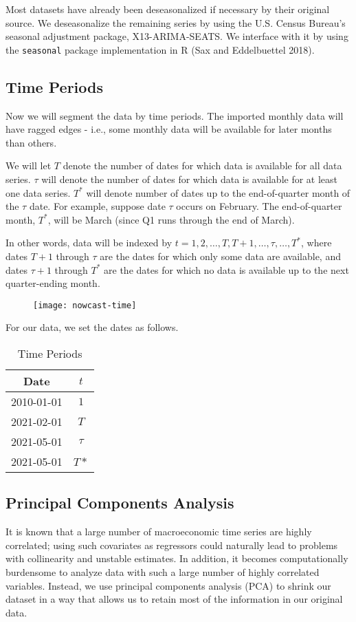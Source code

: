 \documentclass[11pt, letterpaper]{article}\usepackage[]{graphicx}\usepackage[]{color}
\begin{document}
Most datasets have already been deseasonalized if necessary by their original source. We deseasonalize the remaining series by using the U.S. Census Bureau's seasonal adjustment package, X13-ARIMA-SEATS. We interface with it by using the \texttt{seasonal} package implementation in R (Sax and Eddelbuettel 2018).

\subsection{Time Periods}
Now we will segment the data by time periods. The imported monthly data will have ragged edges - i.e., some monthly data will be available for later months than others.

We will let $T$ denote the number of dates for which data is available for all data series. $\tau$ will denote the number of dates for which data is available for at least one data series. $T^*$ will denote number of dates up to the end-of-quarter month of the $\tau$ date. For example, suppose date $\tau$ occurs on February. The end-of-quarter month, $T^*$, will be March (since Q1 runs through the end of March). 

In other words, data will be indexed by $t = 1, 2, \dots, T, T+1, \dots, \tau, \dots, T^*$, where dates $T + 1$ through $\tau$ are the dates for which only some data are available, and dates $\tau + 1$ through $T^*$ are the dates for which no data is available up to the next quarter-ending month.
\begin{figure}[H]
\texttt{[image: nowcast-time]}
\centering
\end{figure}
For our data, we set the dates as follows.
\begin{table}[H]
\centering
\begingroup\footnotesize
\begin{tabular}{cc}
  \hline
Date & $t$ \\ 
  \hline
2010-01-01 & $1$ \\ 
  2021-02-01 & $T$ \\ 
  2021-05-01 & $\tau$ \\ 
  2021-05-01 & $T*$ \\ 
   \hline
\end{tabular}
\endgroup
\caption{Time Periods} 
\end{table}


\subsection{Principal Components Analysis}
It is known that a large number of macroeconomic time series are highly correlated; using such covariates as regressors could naturally lead to problems with collinearity and unstable estimates. In addition, it becomes computationally burdensome to analyze data with such a large number of highly correlated variables. Instead, we use principal components analysis (PCA) to shrink our dataset in a way that allows us to retain most of the information in our original data.
\end{document}
